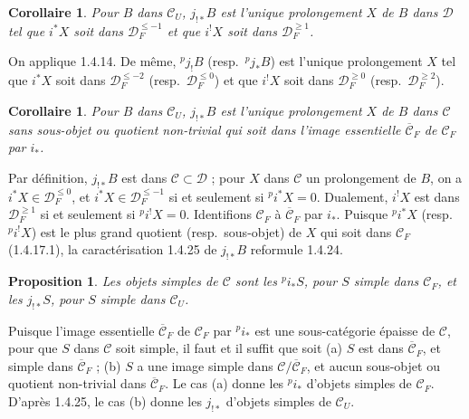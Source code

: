 \documentclass[12pt,a4paper]{article}
\theoremstyle{plain}
\newtheorem{proposition}[theorem]{Proposition}
\newtheorem{corollary}[theorem]{Corollaire}
\theoremstyle{definition}
\begin{document}
\begin{corollary}\label{cor:1.4.24}
Pour $B$ dans $\mathcal{C}_U$, $j_{!*} B$ est l'unique prolongement $X$ de $B$ dans $\mathcal{D}$ tel que $i^* X$ soit dans $\mathcal{D}_F^{\leqslant -1}$ et que $i^! X$ soit dans $\mathcal{D}_F^{\geqslant 1}$.
\end{corollary}

On applique 1.4.14. De m\^eme, ${}^p j_! B$ (resp.\ ${}^p j_* B$) est l'unique prolongement $X$ tel que $i^* X$ soit dans $\mathcal{D}_F^{\leqslant -2}$ (resp.\ $\mathcal{D}_F^{\leqslant 0}$) et que $i^! X$ soit dans $\mathcal{D}_F^{\geqslant 0}$ (resp.\ $\mathcal{D}_F^{\geqslant 2}$).

\begin{corollary}\label{cor:1.4.25}
Pour $B$ dans $\mathcal{C}_U$, $j_{!*} B$ est l'unique prolongement $X$ de $B$ dans $\mathcal{C}$ sans sous-objet ou quotient non-trivial qui soit dans l'image essentielle $\overline{\mathcal{C}}_F$ de $\mathcal{C}_F$ par $i_*$.
\end{corollary}

Par d\'efinition, $j_{!*} B$ est dans $\mathcal{C} \subset \mathcal{D}$ ; pour $X$ dans $\mathcal{C}$ un prolongement de $B$, on a $i^* X \in \mathcal{D}_F^{\leqslant 0}$, et $i^* X \in \mathcal{D}_F^{\leqslant -1}$ si et seulement si ${}^p i^* X = 0$. Dualement, $i^! X$ est dans $\mathcal{D}_F^{\geqslant 1}$ si et seulement si ${}^p i^! X = 0$. Identifions $\mathcal{C}_F$ \`a $\overline{\mathcal{C}}_F$ par $i_*$. Puisque ${}^p i^* X$ (resp.\ ${}^p i^! X$) est le plus grand quotient (resp.\ sous-objet) de $X$ qui soit dans $\mathcal{C}_F$ (1.4.17.1), la caract\'erisation 1.4.25 de $j_{!*} B$ reformule 1.4.24.

\begin{proposition}\label{prop:1.4.26}
Les objets simples de $\mathcal{C}$ sont les ${}^p i_* S$, pour $S$ simple dans $\mathcal{C}_F$, et les $j_{!*} S$, pour $S$ simple dans $\mathcal{C}_U$.
\end{proposition}

Puisque l'image essentielle $\overline{\mathcal{C}}_F$ de $\mathcal{C}_F$ par ${}^p i_*$ est une sous-cat\'egorie \'epaisse de $\mathcal{C}$, pour que $S$ dans $\mathcal{C}$ soit simple, il faut et il suffit que soit (a) $S$ est dans $\overline{\mathcal{C}}_F$, et simple dans $\overline{\mathcal{C}}_F$ ; (b) $S$ a une image simple dans $\mathcal{C}/\overline{\mathcal{C}}_F$, et aucun sous-objet ou quotient non-trivial dans $\overline{\mathcal{C}}_F$. Le cas (a) donne les ${}^p i_*$ d'objets simples de $\mathcal{C}_F$. D'apr\`es 1.4.25, le cas (b) donne les $j_{!*}$ d'objets simples de $\mathcal{C}_U$.
\end{document}
